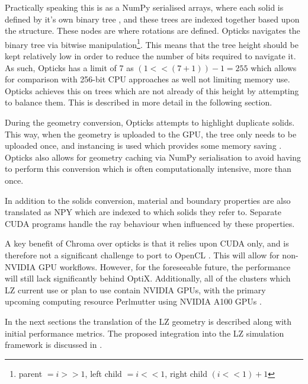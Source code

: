 Practically speaking this is as a NumPy serialised arrays, where each solid is defined by it's own binary tree \cite{Opticks_Paper_2017_ref}, and these trees are indexed together based upon the structure.
These nodes are where rotations are defined.
Opticks navigates the binary tree via bitwise manipulation\footnote{parent $=i >> 1$, left child $= i << 1$, right child $(i<<1)+1$}.
This means that the tree height should be kept relatively low in order to reduce the number of bits required to navigate it.
As such, Opticks has a limit of 7 as $(1 << (7 + 1)) - 1 = 255$ which allows for comparison with 256-bit CPU approaches as well not limiting memory use.
Opticks achieves this on trees which are not already of this height by attempting to balance them.
This is described in more detail in the following section.
\par
During the geometry conversion, Opticks attempts to highlight duplicate solids.
This way, when the geometry is uploaded to the GPU, the tree only needs to be uploaded once, and instancing is used which provides some memory saving \cite{Opticks_CHEP_2019_ref}.
Opticks also allows for geometry caching via NumPy serialisation \cite{Opticks_Paper_2017_ref} to avoid having to perform this conversion which is often computationally intensive, more than once.
\par
In addition to the solids conversion, material and boundary properties are also translated as NPY which are indexed to which solids they refer to.
Separate CUDA programs handle the ray behaviour when influenced by these properties.
\par
A key benefit of Chroma over opticks is that it relies upon CUDA only, and is therefore not a significant challenge to port to OpenCL \cite{chroma_whitepaper_ref}.
This will allow for non-NVIDIA GPU workflows.
However, for the foreseeable future, the performance will still lack significantly behind OptiX.
Additionally, all of the clusters which LZ current use or plan to use contain NVIDIA GPUs, with the primary upcoming computing resource Perlmutter using NVIDIA A100 GPUs \cite{perlmutter_ref}.
\par
In the next sections the translation of the LZ geometry is described along with initial performance metrics.
The proposed integration into the LZ simulation framework is discussed in \cite{SEriksen_Opticks_CHEP_2021_ref}.

